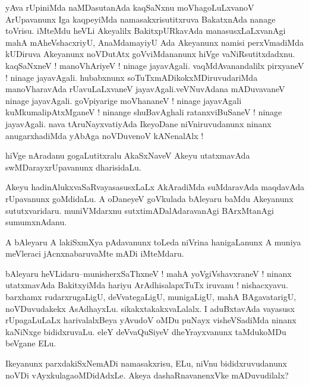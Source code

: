 \documentclass{article}
\begin{document}
\begin{mn}%
yAva rUpiniMda naMDasutanAda kaqSaNxnu moVhagoLuLxvanoV ArUpavanunx Iga kaqpeyiMda  
namasakxrisutitxruva BakatxnAda nanage toVrisu. iMteMdu heVLi Akeyalilx BakitxpURkavAda 
manasusxLaLxvanAgi mahA mAheVshacxriyU, AnaMdamayiyU Ada Akeyanunx namisi perxVmadiMda 
kUDiruva Akeyanunx noVDutAtx goVviMdananunx hiVge vaNiRsutitxdadxnu. kaqSaNxneV ! 
manoVhAriyeV ! ninage jayavAgali. vaqMdAvanandalilx pirxyaneV ! ninage jayavAgali. 
hubabxnunx soTuTxmADikokxMDiruvudariMda manoVharavAda rUavuLaLxvaneV jayavAgali.veVNuvAdana
mADuvavaneV  ninage jayavAgali. goVpiyarige moVhananeV ! ninage jayavAgali 
kuMkumalipAtxMganeV ! ninange shuBavAghali ratanxviBuSaneV ! ninage jayavAgali. nava 
tAruNayxvatiyAda IkeyoDane niVniruvudanunx ninanx anugarxhadiMda yAbAga noVDuvenoV 
kANenalAlx ! 
\end{mn}

\begin{mn}%
hiVge nAradanu gogaLutitxralu AkaSxNaveV Akeyu utatxmavAda swMDarayxrUpavanunx dharisidaLu.
\end{mn}

\begin{mn}%
Akeyu hadinAlukxvaSaRvayasasusxLaLx AkAradiMda suMdaravAda maqdavAda rUpavanunx goMdidaLu.
A oDaneyeV goVkulada bAleyaru baMdu Akeyanunx sututxvaridaru. muniVMdarxnu 
sutxtimADalAdaravanAgi BArxMtanAgi sumumxnAdanu.
\end{mn}

\begin{mn}%
A bAleyaru A lakiSxmXya pAdavanunx toLeda niVrina hanigaLanunx A muniya meVleraci 
jAcnxnabaruvaMte mADi iMteMdaru.
\end{mn}

\begin{mn}%
bAleyaru heVLidaru--munisherxSaThxneV ! mahA yoVgiVshavxraneV ! ninanx utatxmavAda 
BakitxyiMda hariyu ArAdhisalapxTuTx iruvanu ! nishacxyavu. barxhamx rudarxrugaLigU, 
deVvategaLigU, munigaLigU, mahA BAgavatarigU, noVDuvudakekx AsAdhayxLu. 
sikakxtakakxvaLalalx. I aduBxtavAda vayasusx rUpagaLuLaLx harivalalxBeya yAvudoV oMDu 
puNayx visheVSadiMda ninanx kaNiNxge bididxruvaLu. eleY deVvaQuSiyeV dheYrayxvanunx 
taMdukoMDu beVgane ELu.
\end{mn}

\begin{mn}%
Ikeyanunx parxdakiSxNemADi namasakxrisu, ELu, niVnu bididxruvudanunx noVDi 
vAyxkulagaoMDidAdxLe. Akeya dashaRnavanenxVke mADuvudilalx?
\end{mn}
\end{document}
